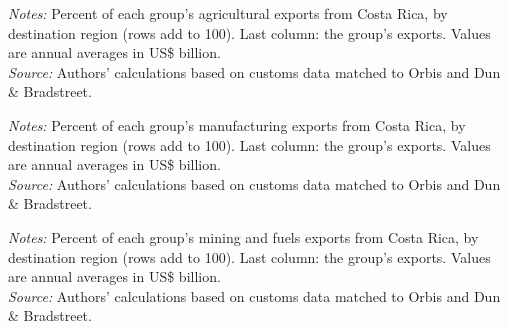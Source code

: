 \documentclass[11pt,a4paper]{article}
\begin{document}
\begin{table}[H]\centering\small%
  \caption{Costa Rica, Agriculture: Multinational Exports by Parent Region and Destination Region}%
  \label{tab:c_reg_CRI_agro}%
  \par\vspace{3pt}%
  \begin{minipage}{0.95\textwidth}\footnotesize %
  \textit{Notes:} Percent of each group's agricultural exports from Costa Rica, by destination region (rows add to 100). Last column: the group's exports. Values are annual averages in US\$ billion.\\[3pt]%
  \textit{Source:} Authors' calculations based on customs data matched to Orbis and Dun \& Bradstreet.%
  \end{minipage}%
  \end{table}
\begin{table}[H]\centering\small%
  \caption{Costa Rica, Manufacturing: Multinational Exports by Parent Region and Destination Region}%
  \label{tab:c_reg_CRI_manufacturing}%
  \par\vspace{3pt}%
  \begin{minipage}{0.95\textwidth}\footnotesize %
  \textit{Notes:} Percent of each group's manufacturing exports from Costa Rica, by destination region (rows add to 100). Last column: the group's exports. Values are annual averages in US\$ billion.\\[3pt]%
  \textit{Source:} Authors' calculations based on customs data matched to Orbis and Dun \& Bradstreet.%
  \end{minipage}%
  \end{table}
\begin{table}[H]\centering\small%
  \caption{Costa Rica, Mining and Fuels: Multinational Exports by Parent Region and Destination Region}%
  \label{tab:c_reg_CRI_mining}%
  \par\vspace{3pt}%
  \begin{minipage}{0.95\textwidth}\footnotesize %
  \textit{Notes:} Percent of each group's mining and fuels exports from Costa Rica, by destination region (rows add to 100). Last column: the group's exports. Values are annual averages in US\$ billion.\\[3pt]%
  \textit{Source:} Authors' calculations based on customs data matched to Orbis and Dun \& Bradstreet.%
  \end{minipage}%
  \end{table}
\end{document}
